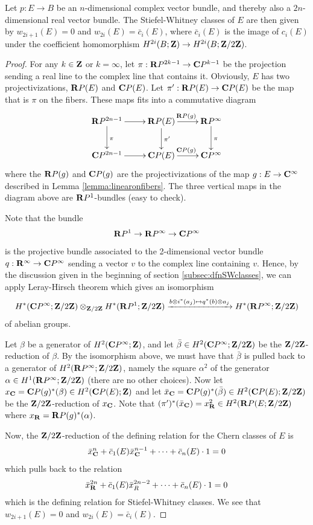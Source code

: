 \documentclass[a4paper,openany]{scrbook}
\begin{document}
\begin{thm}
Let $p:E\to B$ be an $n$-dimensional complex vector bundle, and thereby also a $2n$-dimensional real vector bundle. The Stiefel-Whitney classes of $E$ are then given by $w_{2i+1}(E)=0$ and $w_{2i}(E)=\bar c_i(E)$, where $\bar c_i(E)$ is the image of $c_i(E)$ under the coefficient homomorphism $H^{2i}(B;\mathbf Z)\to H^{2i}(B;\mathbf Z/2\mathbf Z)$.
\end{thm}
\begin{proof}
 For any $k\in\mathbf Z$ or $k=\infty$, let $\pi: \mathbf R P^{2k-1}\to \mathbf C P^{k-1}$ be the projection sending a real line to the complex line that contains it. Obviously, $E$ has two projectivizations, $\mathbf R P(E)$ and $\mathbf C P(E)$. Let 
 $\pi':\mathbf R P(E)\to \mathbf C P(E)$ be the map that is $\pi$ on the fibers.
 These maps fits into a commutative diagram
 $$\xymatrix{\R P^{2n-1}\ar[r]\ar[d]^\pi & \R P(E)\ar[r]^{\R P(g)}\ar[d]^{\pi'} & \R P^\infty\ar[d]^\pi\\
 \CP^{2n-1}\ar[r] & \CP(E)\ar[r]^{\CP(g)} & \CP^\infty}
 $$
 where the $\mathbf R P(g)$ and $\mathbf C P(g)$ are the projectivizations of the map $g:E\to\mathbf C^\infty$ described in Lemma \ref{lemma:linearonfibers}. The three vertical maps in the diagram above are $\mathbf R P^1$-bundles (easy to check).
 
 Note that the bundle 
 $$\mathbf R P^1\to \mathbf R P^\infty\to\mathbf C P^\infty$$ is the projective bundle associated to the 2-dimensional vector bundle $q: \mathbf R^\infty\to\mathbf C P^\infty$ sending a vector $v$ to the complex line containing $v$. Hence, by the discussion given in the beginning of section \ref{subsec:dfnSWclasses}, we can apply Leray-Hirsch theorem which gives an isomorphism
 $$H^*(\mathbf C P^\infty;\mathbf Z/2\mathbf Z)\otimes_{\mathbf Z/2\mathbf Z} H^*(\mathbf R P^1;\mathbf Z/2\mathbf Z)\xrightarrow{b\otimes i^*(a_j)\mapsto q^*(b)\otimes a_j}H^*(\mathbf R P^\infty;\mathbf Z/2\mathbf Z)$$ of abelian groups. 
 
 Let $\beta$ be a generator of $H^2(\mathbf C P^\infty;\mathbf Z)$, and let $\bar\beta\in H^2(\mathbf C P^\infty;\mathbf Z/2\mathbf Z)$ be the $\mathbf Z/2\mathbf Z$-reduction of $\beta$. By the isomorphism above, we must have that $\bar\beta$ is pulled back to a generator of $H^2(\mathbf R P^\infty; \mathbf Z/2\mathbf Z)$, namely the square $\alpha^2$ of the generator $\alpha\in H^1(\mathbf R P^\infty;\mathbf Z/2\mathbf Z)$ (there are no other choices).
 Now let $x_\mathbf C = \mathbf C P(g)^*(\beta)\in H^2(\mathbf C P(E);\mathbf Z)$ and let $\bar x_\mathbf C = \mathbf C P(g)^*(\bar\beta)\in H^2(\mathbf C P(E);\mathbf Z/2\mathbf Z)$ be the $\mathbf Z/2\mathbf Z$-reduction of $x_\mathbf C$. Note that $(\pi')^*(\bar x_\mathbf C)=x_\mathbf R^2\in H^2(\mathbf R P(E;\mathbf Z/2\mathbf Z)$ where $x_\mathbf R = \mathbf R P(g)^*(\alpha)$.
 
 Now, the $\mathbf Z/2\mathbf Z$-reduction of the defining relation for the Chern classes of $E$ is
 $$\bar x_\mathbf C^n + \bar c_{1}(E)\bar x_\mathbf C^{n-1}+\cdots+\bar c_{n}(E)\cdot 1 = 0$$ which pulls back to the relation  $$\bar x_\mathbf R^{2n} + \bar c_{1}(E)\bar x_R^{2n-2}+\cdots+\bar c_{n}(E)\cdot 1 = 0$$ which is the defining relation for Stiefel-Whitney classes. We see that $w_{2i+1}(E)=0$ and $w_{2i}(E)=\bar c_i(E)$.
\end{proof}  
\end{document}
